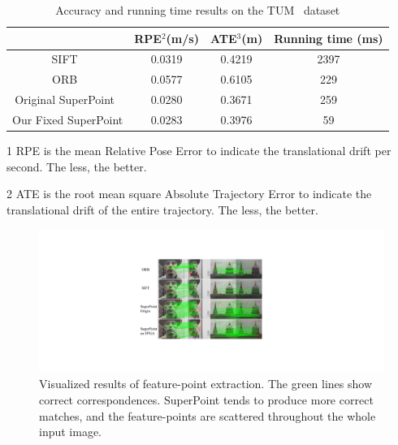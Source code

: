 \begin{table}[t]
 \centering
 \caption{ Accuracy and running time results on the TUM~\cite{sturm12iros} dataset }
 \footnotesize
 \begin{threeparttable}
\begin{tabular}{|c|c|c|c|} 
 \hline
 & RPE$^2$(m/s) & ATE$^3$(m) & Running time (ms) \bigstrut\\
 \hline
 SIFT~\cite{Lowe-478} & 0.0319 & 0.4219 & 2397 \bigstrut\\
 \hline
 ORB~\cite{Mur-Artal:2017281} & 0.0577 & 0.6105 & 229 \bigstrut\\
 \hline
 Original SuperPoint~\cite{detone2018superpoint} & 0.0280 & 0.3671 & 259 \bigstrut\\
 \hline
 Our Fixed SuperPoint & 0.0283 & 0.3976 & 59 \bigstrut\\
 \hline
 \end{tabular}%
 

\begin{tablenotes}
 \scriptsize
 \item[1] RPE is the mean Relative Pose Error to indicate the translational drift per second. The less, the better.
 \item[2] ATE is the root mean square Absolute Trajectory Error to indicate the translational drift of the entire trajectory. The less, the better.
\end{tablenotes}
 \end{threeparttable}
 \label{tab:VO}%
\end{table}%


\begin{figure}[t]
 \centering 
 \includegraphics[width=0.99\linewidth]{fig/visual.pdf}
 \vspace{-5mm}
 \caption{Visualized results of feature-point extraction. The green lines show correct correspondences. SuperPoint tends to produce more correct matches, and the feature-points are scattered throughout the whole input image. }
 \label{fig:dputorch}
\end{figure}


